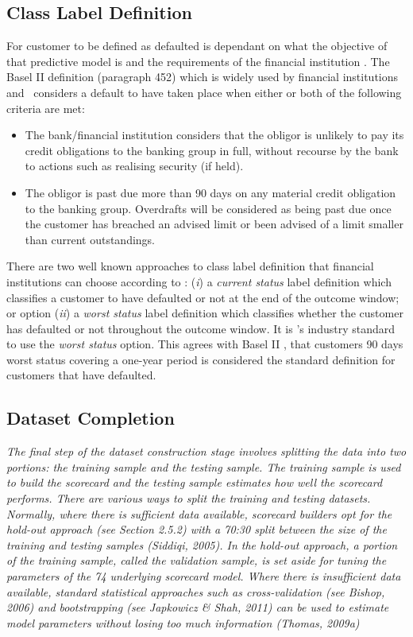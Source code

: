 \subsection{Class Label Definition} \label{classLabelDef}
For customer to be defined as defaulted is dependant on what the objective of that predictive model is and the requirements of the financial institution \citep{mcnab_principles_2000}. The Basel II definition (paragraph 452) which is widely used by financial institutions and \subjectname\ considers a default to have taken place when either or both of the following criteria are met:
\vspace{-3mm} 
\begin{itemize}
	\item The bank/financial institution considers that the obligor is unlikely to pay its credit obligations to the banking group in full, without recourse by the bank to actions such as realising security (if held).
	\item The obligor is past due more than 90 days on any material credit obligation to the banking group. Overdrafts will be considered as being past due once the customer has breached an advised limit or been advised of a limit smaller than current outstandings.
\end{itemize} 

There are two well known approaches to class label definition that financial institutions can choose according to \cite{anderson_credit_2007}: (\textit{i}) a \textit{current status} label definition which classifies a customer to have defaulted or not at the end of the outcome window; or option (\textit{ii}) a \textit{worst status} label definition which classifies whether the customer has defaulted or not throughout the outcome window. It is \subjectname's industry standard to use the \textit{worst status} option. This agrees with Basel II \citep{basel_international_2006}, that customers 90 days worst status covering a one-year period is considered the standard definition for customers that have defaulted. 

\subsection{Dataset Completion}
\textit{
The final step of the dataset construction stage involves splitting the data into two
portions: the training sample and the testing sample. The training sample is used
to build the scorecard and the testing sample estimates how well the scorecard performs.
There are various ways to split the training and testing datasets. Normally,
where there is sufficient data available, scorecard builders opt for the hold-out approach
(see Section 2.5.2) with a 70:30 split between the size of the training and
testing samples (Siddiqi, 2005). In the hold-out approach, a portion of the training
sample, called the validation sample, is set aside for tuning the parameters of the
74
underlying scorecard model.
Where there is insufficient data available, standard statistical approaches such as
cross-validation (see Bishop, 2006) and bootstrapping (see Japkowicz \& Shah, 2011)
can be used to estimate model parameters without losing too much information
(Thomas, 2009a) \citep{kennedy_credit_2013}
}

